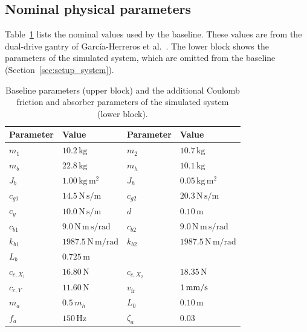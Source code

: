 \subsection{Nominal physical parameters}\label{app:params}
Table~\ref{tab:nominal_parameters} lists the nominal values used by the
baseline.
These values are from the dual-drive gantry of Garc\'ia-Herreros et
al.~\cite[Table~I]{garcia2013model}.
The lower block shows the parameters of the simulated system, which are
omitted from the baseline (Section~\ref{sec:setup_system}).
\begin{table}[!ht]
\caption{Baseline parameters (upper block) and the additional
Coulomb friction and absorber parameters of the simulated system
(lower block).}
\label{tab:nominal_parameters}
\centering
\footnotesize
\begin{tabular}{@{}ll@{\qquad}ll@{}}
\toprule
Parameter & Value & Parameter & Value \\
\midrule
$m_1$ & $10.2\,\mathrm{kg}$ & $m_2$ & $10.7\,\mathrm{kg}$ \\
$m_b$ & $22.8\,\mathrm{kg}$ & $m_h$ & $10.1\,\mathrm{kg}$ \\
$J_b$ & $1.00\,\mathrm{kg\,m^2}$ & $J_h$ & $0.05\,\mathrm{kg\,m^2}$ \\
$c_{g1}$ & $14.5\,\mathrm{N\,s/m}$ & $c_{g2}$ & $20.3\,\mathrm{N\,s/m}$ \\
$c_y$ & $10.0\,\mathrm{N\,s/m}$ & $d$ & $0.10\,\mathrm{m}$ \\
$c_{b1}$ & $9.0\,\mathrm{N\,m\,s/rad}$ & $c_{b2}$ & $9.0\,\mathrm{N\,m\,s/rad}$ \\
$k_{b1}$ & $1987.5\,\mathrm{N\,m/rad}$ & $k_{b2}$ & $1987.5\,\mathrm{N\,m/rad}$ \\
$L_b$ & $0.725\,\mathrm{m}$ & & \\
\midrule
$c_{c,X_1}$ & $16.80\,\mathrm{N}$ & $c_{c,X_2}$ & $18.35\,\mathrm{N}$ \\
$c_{c,Y}$ & $11.60\,\mathrm{N}$ & $v_{\mathrm{fr}}$ & $1\,\mathrm{mm/s}$ \\
$m_a$ & $0.5\,m_h$ & $L_0$ & $0.10\,\mathrm{m}$ \\
$f_a$ & $150\,\mathrm{Hz}$ & $\zeta_a$ & $0.03$ \\
\bottomrule
\end{tabular}
\end{table}

